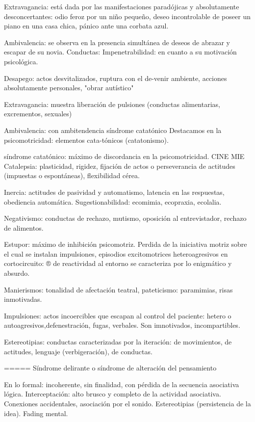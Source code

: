 Extravagancia: está dada por las manifestaciones paradójicas y absolutamente desconcertantes: odio feroz por un niño pequeño, deseo incontrolable de poseer un piano en una casa chica, pánico ante una corbata azul.

Ambivalencia: se observa en la presencia simultánea de deseos de abrazar y escapar de su novia. Conductas: Impenetrabilidad: en cuanto a su motivación psicológica.

Desapego: actos desvitalizados, ruptura con el de-venir ambiente, acciones absolutamente personales, "obrar autístico"

Extravagancia: muestra liberación de pulsiones (conductas alimentarias, excrementos, sexuales)

Ambivalencia: con ambitendencia síndrome catatónico Destacamos en la psicomotricidad: elementos cata-tónicos (catatonismo).

síndrome catatónico: máximo de discordancia en la psicomotricidad. CINE MIE Catalepsia: plasticidad, rigidez, fijación de actos o perseverancia de actitudes (impuestas o espontáneas), flexibilidad cérea.

Inercia: actitudes de pasividad y automatismo, latencia en las respuestas, obediencia automática. Sugestionabilidad: ecomimia, ecopraxia, ecolalia.

Negativismo: conductas de rechazo, mutismo, oposición al entrevistador, rechazo de alimentos.

Estupor: máximo de inhibición psicomotriz. Perdida de la iniciativa motriz sobre el cual se instalan impulsiones, episodios excitomotrices heteroagresivos en cortocircuito: ® de reactividad al entorno se caracteriza por lo enigmático y absurdo.

Manierismos: tonalidad de afectación teatral, pateticismo: paramimias, risas inmotivadas.

Impulsiones: actos incoercibles que escapan al control del paciente: hetero o autoagresivos,defenestración, fugas, verbales. Son imnotivados, incompartibles.

Estereotipias: conductas caracterizadas por la iteración: de movimientos, de actitudes, lenguaje (verbigeración), de conductas.

===== Síndrome delirante o síndrome de alteración del pensamiento

En lo formal: incoherente, sin finalidad, con pérdida de la secuencia asociativa lógica. Interceptación: alto brusco y completo de la actividad asociativa. Conexiones accidentales, asociación por el sonido. Estereotipias (persistencia de la idea). Fading mental.

